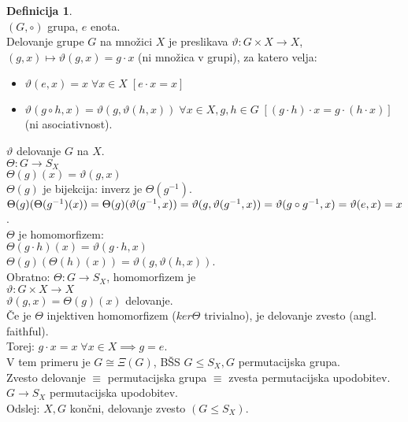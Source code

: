 \documentclass[a4paper, 12pt]{book}
\theoremstyle{definition}
\newtheorem{defn}[counter]{Definicija}
\theoremstyle{remark}
\begin{document}
\begin{defn} \text{} \\
  $(G, \circ)$ grupa, $e$ enota. \\
  Delovanje grupe $G$ na množici $X$ je preslikava $\vartheta: G \times X \to X$, \\
  $(g, x) \mapsto \vartheta(g, x) = g \cdot x$ (ni množica v grupi), za katero velja:
  \begin{itemize}
    \item $\vartheta(e, x) = x \; \forall x \in X \; [e \cdot x = x]$
    \item $\vartheta(g \circ h, x) = \vartheta(g, \vartheta(h, x)) \; \forall x \in X, g,h \in G \;
      [(g \cdot h) \cdot x = g \cdot (h \cdot x)]$ (ni asociativnost).
  \end{itemize}
\end{defn}
$\vartheta$ delovanje $G$ na $X$. \\
$\Theta: G \to S_X$ \\
$\Theta(g)(x) = \vartheta(g, x)$ \\
$\Theta(g)$ je bijekcija: inverz je $\Theta(g^{-1})$. \\
$\Theta(g)(\Theta(g^{-1})(x)) = \Theta(g)(\vartheta(g^{-1}, x)) = \vartheta(g, \vartheta(g^{-1}, x)) \\
= \vartheta(g \circ g^{-1}, x) = \vartheta(e, x) = x$. \\
$\Theta$ je homomorfizem: \\
$\Theta(g \cdot h)(x) = \vartheta(g \cdot h, x)$ \\
$\Theta(g)(\Theta(h)(x)) = \vartheta(g, \vartheta(h, x))$. \\
Obratno: $\Theta: G \to S_X$, homomorfizem je \\
$\vartheta: G \times X \to X$ \\
$\vartheta(g, x) = \Theta(g)(x)$ delovanje. \\
Če je $\Theta$ injektiven homomorfizem ($ker \Theta$ trivialno), je delovanje zvesto (angl. faithful). \\
Torej: $g \cdot x = x \; \forall x \in X \implies g = e$. \\
V tem primeru je $G \cong \Xi(G)$, BŠS $G \leq S_X, G$ permutacijska grupa. \\
Zvesto delovanje $\equiv$ permutacijska grupa $\equiv$ zvesta permutacijska upodobitev. \\
$G \to S_X$ permutacijska upodobitev. \\
Odslej: $X, G$ končni, delovanje zvesto $(G \leq S_X)$. \\
\end{document}
